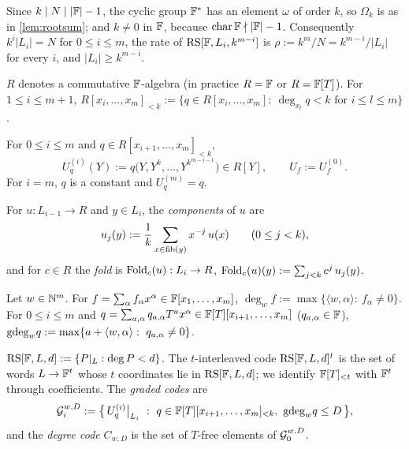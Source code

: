 Since $k\mid N\mid|\mathbb{F}|-1$, the cyclic group $\mathbb{F}^*$ has an element $\omega$ of order $k$, so
$\Omega_k$ is as in \cref{lem:rootsum}; and $k\ne0$ in $\mathbb{F}$, because
$\operatorname{char}\mathbb{F}\nmid|\mathbb{F}|-1$. Consequently $k^i|L_i|=N$ for $0\le i\le m$, the rate of
$\mathrm{RS}[\mathbb{F},L_i,k^{m-i}]$ is $\rho:=k^m/N=k^{m-i}/|L_i|$ for every $i$, and $|L_i|\ge k^{m-i}$.

\begin{definition}[Polynomials]\label{def:poly}
$R$ denotes a commutative $\mathbb{F}$-algebra (in practice $R=\mathbb{F}$ or $R=\mathbb{F}[T]$). For
$1\le i\le m+1$, $R[x_i,\dots,x_m]_{<k}:=\{q\in R[x_i,\dots,x_m]:\ \deg_{x_l}q<k\text{ for }i\le l\le m\}$.
\end{definition}

\begin{definition}\label{def:kron}
For $0\le i\le m$ and $q\in R[x_{i+1},\dots,x_m]_{<k}$,
\[
U^{(i)}_q(Y):=q\big(Y,Y^{k},\dots,Y^{k^{m-i-1}}\big)\in R[Y],\qquad U_f:=U^{(0)}_f .
\]
For $i=m$, $q$ is a constant and $U^{(m)}_q=q$.
\end{definition}

\begin{definition}[Fold]\label{def:fold}
For $u:L_{i-1}\to R$ and $y\in L_i$, the \emph{components} of $u$ are
\[
u_j(y):=\frac1k\sum_{x\in\mathrm{fib}(y)}x^{-j}\,u(x)\qquad(0\le j<k),
\]
and for $c\in R$ the \emph{fold} is $\mathrm{Fold}_c(u):L_i\to R$,
$\mathrm{Fold}_c(u)(y):=\sum_{j<k}c^j\,u_j(y)$.
\end{definition}

\begin{definition}\label{def:wdeg}
Let $w\in\mathbb{N}^m$. For $f=\sum_\alpha f_\alpha x^\alpha\in\mathbb{F}[x_1,\dots,x_m]$,
$\deg_w f:=\max\{\langle w,\alpha\rangle:\ f_\alpha\ne0\}$. For $0\le i\le m$ and
$q=\sum_{a,\alpha}q_{a,\alpha}T^ax^\alpha\in\mathbb{F}[T][x_{i+1},\dots,x_m]$ ($q_{a,\alpha}\in\mathbb{F}$),
$\gdeg_w q:=\max\{a+\langle w,\alpha\rangle:\ q_{a,\alpha}\ne0\}$.
\end{definition}

\begin{definition}[Codes]\label{def:codes}
$\mathrm{RS}[\mathbb{F},L,d]:=\{P|_L:\deg P<d\}$. The $t$-interleaved code $\mathrm{RS}[\mathbb{F},L,d]^t$ is the set
of words $L\to\mathbb{F}^t$ whose $t$ coordinates lie in $\mathrm{RS}[\mathbb{F},L,d]$; we identify
$\mathbb{F}[T]_{<t}$ with $\mathbb{F}^t$ through coefficients. The \emph{graded codes} are
\[
\Gc_i^{w,D}:=\big\{\,U^{(i)}_q\big|_{L_i}\ :\ q\in\F[T][x_{i+1},\dots,x_m]_{<k},\ \gdeg_w q\le D\,\big\},
\]
and the \emph{degree code} $C_{w,D}$ is the set of $T$-free elements of $\mathcal{G}_0^{w,D}$.
\end{definition}

